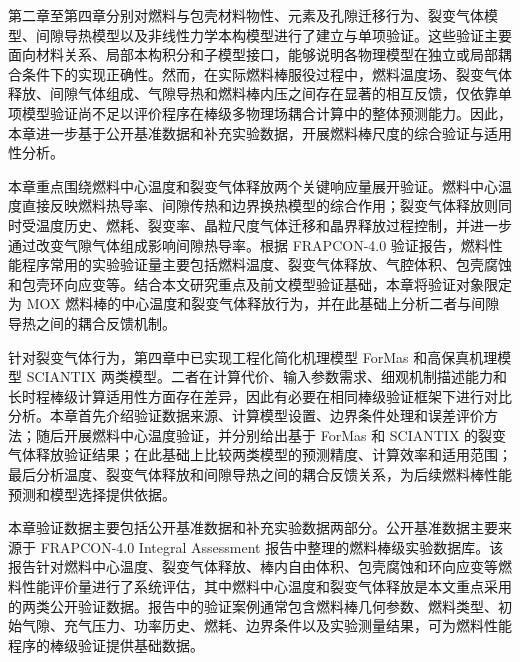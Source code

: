 


第二章至第四章分别对燃料与包壳材料物性、元素及孔隙迁移行为、裂变气体模型、间隙导热模型以及非线性力学本构模型进行了建立与单项验证。这些验证主要面向材料关系、局部本构积分和子模型接口，能够说明各物理模型在独立或局部耦合条件下的实现正确性。然而，在实际燃料棒服役过程中，燃料温度场、裂变气体释放、间隙气体组成、气隙导热和燃料棒内压之间存在显著的相互反馈，仅依靠单项模型验证尚不足以评价程序在棒级多物理场耦合计算中的整体预测能力。因此，本章进一步基于公开基准数据和补充实验数据，开展燃料棒尺度的综合验证与适用性分析。

本章重点围绕燃料中心温度和裂变气体释放两个关键响应量展开验证。燃料中心温度直接反映燃料热导率、间隙传热和边界换热模型的综合作用；裂变气体释放则同时受温度历史、燃耗、裂变率、晶粒尺度气体迁移和晶界释放过程控制，并进一步通过改变气隙气体组成影响间隙热导率。根据 FRAPCON-4.0 验证报告，燃料性能程序常用的实验验证量主要包括燃料温度、裂变气体释放、气腔体积、包壳腐蚀和包壳环向应变等。结合本文研究重点及前文模型验证基础，本章将验证对象限定为 MOX 燃料棒的中心温度和裂变气体释放行为，并在此基础上分析二者与间隙导热之间的耦合反馈机制。

针对裂变气体行为，第四章中已实现工程化简化机理模型 ForMas 和高保真机理模型 SCIANTIX 两类模型。二者在计算代价、输入参数需求、细观机制描述能力和长时程棒级计算适用性方面存在差异，因此有必要在相同棒级验证框架下进行对比分析。本章首先介绍验证数据来源、计算模型设置、边界条件处理和误差评价方法；随后开展燃料中心温度验证，并分别给出基于 ForMas 和 SCIANTIX 的裂变气体释放验证结果；在此基础上比较两类模型的预测精度、计算效率和适用范围；最后分析温度、裂变气体释放和间隙导热之间的耦合反馈关系，为后续燃料棒性能预测和模型选择提供依据。




本章验证数据主要包括公开基准数据和补充实验数据两部分。公开基准数据主要来源于 FRAPCON-4.0 Integral Assessment 报告中整理的燃料棒级实验数据库。该报告针对燃料中心温度、裂变气体释放、棒内自由体积、包壳腐蚀和环向应变等燃料性能评价量进行了系统评估，其中燃料中心温度和裂变气体释放是本文重点采用的两类公开验证数据。报告中的验证案例通常包含燃料棒几何参数、燃料类型、初始气隙、充气压力、功率历史、燃耗、边界条件以及实验测量结果，可为燃料性能程序的棒级验证提供基础数据。

